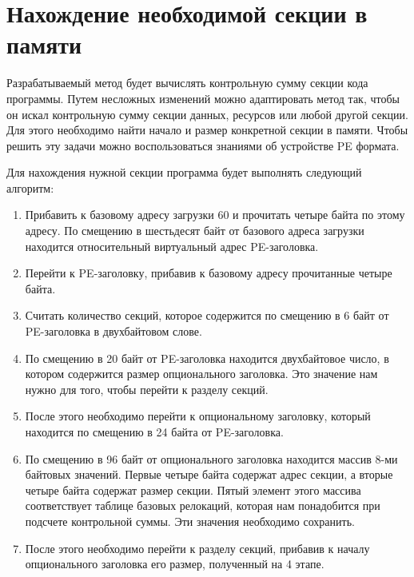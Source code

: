 
\section{Нахождение необходимой секции в памяти}
\label{sec:finding}

Разрабатываемый метод будет вычислять контрольную сумму секции кода программы.
Путем несложных изменений можно адаптировать метод так, чтобы он искал
контрольную сумму секции данных, ресурсов или любой другой секции. Для этого
необходимо найти начало и размер конкретной секции в памяти. Чтобы решить эту
задачи можно воспользоваться знаниями об устройстве PE формата. 

Для нахождения нужной секции программа будет выполнять следующий алгоритм:
\begin{enumerate}[label=\arabic*.]
  \item Прибавить к базовому адресу загрузки 60 и прочитать четыре байта по этому
    адресу. По смещению в шестьдесят байт от базового адреса загрузки находится
    относительный виртуальный адрес PE-заголовка.
    
  \item Перейти к PE-заголовку, прибавив к базовому адресу прочитанные четыре
    байта. 

  \item Считать количество секций, которое содержится по смещению в 6 байт от
    PE-заголовка в двухбайтовом слове.

  \item По смещению в 20 байт от PE-заголовка находится двухбайтовое число, в
    котором содержится размер опционального заголовка. Это значение нам нужно
    для того, чтобы перейти к разделу секций.

  \item После этого необходимо перейти к опциональному заголовку, который
    находится по смещению в 24 байта от PE-заголовка. 

  \item \label{item:dd_offset} По смещению в 96 байт от опционального
    заголовка находится массив 8-ми байтовых значений. Первые четыре байта
    содержат адрес секции, а вторые четыре байта содержат размер секции. Пятый
    элемент этого массива соответствует таблице базовых релокаций, которая нам
    понадобится при подсчете контрольной суммы. Эти значения необходимо
    сохранить.

  \item После этого необходимо перейти к разделу секций, прибавив к началу
    опционального заголовка его размер, полученный на 4 этапе.


\end{enumerate}
